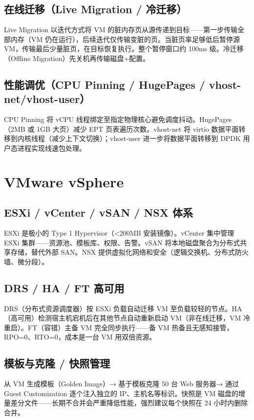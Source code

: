 \documentclass[12pt,UTF8]{ctexbook}
\begin{document}
    \subsection{在线迁移（Live Migration / 冷迁移）}

Live Migration 以迭代方式将 VM 的脏内存页从源传递到目标——第一步传输全部内存（VM 仍在运行），后续迭代仅传输变脏的页。当脏页率足够低后暂停源 VM，传输最后少量脏页，在目标恢复执行。整个暂停窗口约 100ms 级。冷迁移（Offline Migration）先关机再传输磁盘+配置。

    \subsection{性能调优（CPU Pinning / HugePages / vhost-net/vhost-user）}

CPU Pinning 将 vCPU 线程绑定至指定物理核心避免调度抖动。HugePages（2MB 或 1GB 大页）减少 EPT 页表遍历次数。vhost-net 将 virtio 数据平面转移到内核线程（减少上下文切换）；vhost-user 进一步将数据平面转移到 DPDK 用户态进程实现线速包处理。

  \section{VMware vSphere}
    \subsection{ESXi / vCenter / vSAN / NSX 体系}

ESXi 是极小的 Type 1 Hypervisor（<200MB 安装镜像）。vCenter 集中管理 ESXi 集群——资源池、模板库、权限、告警。vSAN 将本地磁盘聚合为分布式共享存储，替代外部 SAN。NSX 提供虚拟化网络和安全（逻辑交换机、分布式防火墙、微分段）。

    \subsection{DRS / HA / FT 高可用}

DRS（分布式资源调度器）按 ESXi 负载自动迁移 VM 至负载较轻的节点。HA（高可用）检测宿主机宕机后在其他节点自动重新启动 VM（非在线迁移，VM 冷重启）。FT（容错）主备 VM 完全同步执行——备 VM 热备且无感知接管，RPO=0、RTO=0，成本是一台 VM 用双倍资源。

    \subsection{模板与克隆 / 快照管理}

从 VM 生成模板（Golden Image）→ 基于模板克隆 50 台 Web 服务器→ 通过 Guest Customization 逐个注入独立的 IP、主机名等标识。快照是 VM 磁盘的增量差分文件——长期不合并会严重降低性能，强烈建议每个快照在 24 小时内删除合并。
\end{document}
